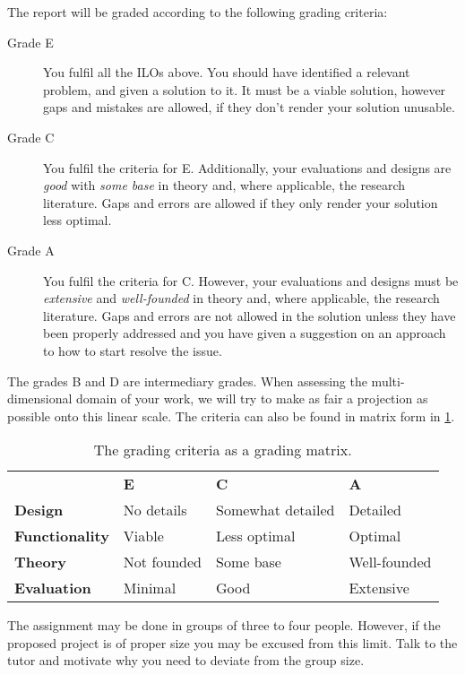 The report will be graded according to the following grading criteria:
\begin{description}
  \item[Grade E] You fulfil all the \acp{ILO} above.
    You should have identified a relevant problem, and given a solution to it.
    It must be a viable solution, however gaps and mistakes are allowed, if 
    they don't render your solution unusable.

  \item[Grade C] You fulfil the criteria for E.
    Additionally, your evaluations and designs are \emph{good} with \emph{some 
      base} in theory and, where applicable, the research literature.
    Gaps and errors are allowed if they only render your solution less optimal.

  \item[Grade A] You fulfil the criteria for C.
    However, your evaluations and designs must be \emph{extensive} and 
    \emph{well-founded} in theory and, where applicable, the research 
    literature.
    Gaps and errors are not allowed in the solution unless they have been 
    properly addressed and you have given a suggestion on an approach to how to 
    start resolve the issue.
\end{description}
The grades B and D are intermediary grades.
When assessing the multi-dimensional domain of your work, we will try to make 
as fair a projection as possible onto this linear scale.
The criteria can also be found in matrix form in \cref{GradingCriteria}.

\begin{table}
  \centering
  \begin{tabular}{l l l l}
                            & \textbf{E}  & \textbf{C}        & \textbf{A} \\
    \textbf{Design}         & No details  & Somewhat detailed & Detailed \\
    \textbf{Functionality}  & Viable      & Less optimal      & Optimal \\
    \textbf{Theory}         & Not founded & Some base         & Well-founded \\
    \textbf{Evaluation}     & Minimal     & Good              & Extensive \\
  \end{tabular}
  \caption{\label{GradingCriteria}%
    The grading criteria as a grading matrix.
  }
\end{table}

The assignment may be done in groups of three to four people.
However, if the proposed project is of proper size you may be excused from this 
limit.
Talk to the tutor and motivate why you need to deviate from the group size.


\printbibliography
